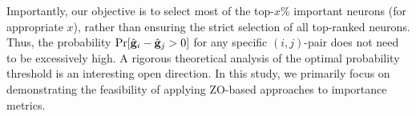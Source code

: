 Importantly, our objective is to select most of the top-$x$\% important neurons (for appropriate $x$), rather than ensuring the strict selection of all top-ranked neurons. Thus, the probability $\Pr[\hat{{\mathbf{g}}}_i-\hat{{\mathbf{g}}}_j>0]$ for any specific $(i,j)$-pair does not need to be excessively high. A rigorous theoretical analysis of the optimal probability threshold is an interesting open direction. In this study, we primarily focus on demonstrating the feasibility of applying ZO-based approaches to importance metrics.